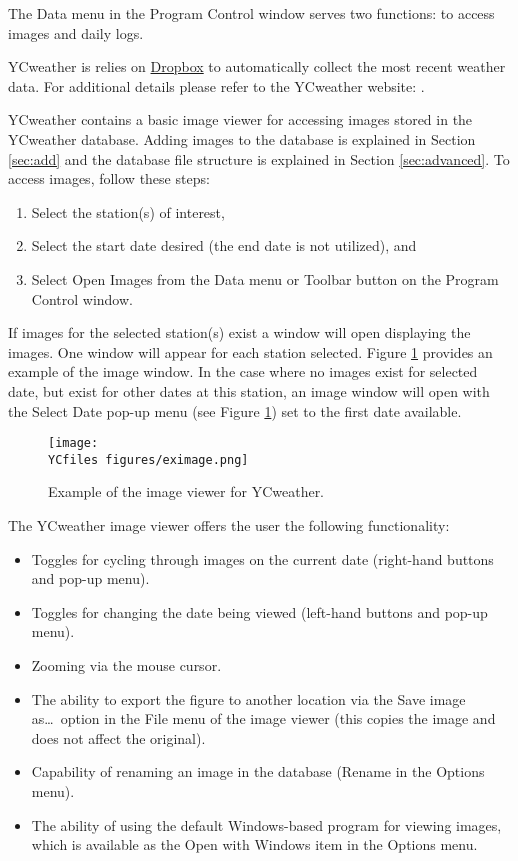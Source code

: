 \label{sec:data}
The Data menu in the Program Control window serves two functions: to access images and daily logs.

YCweather is relies on \href{https://dropbox.com}{Dropbox} to automatically collect the most recent weather data. For additional details please refer to the YCweather website: .

 \label{sec:images}
YCweather contains a basic image viewer for accessing images stored in the YCweather database.  Adding images to the database is explained in Section \ref{sec:add} and the database file structure is explained in Section \ref{sec:advanced}.  To access images, follow these steps:
\begin{enumerate}
	\item Select the station(s) of interest,
	\item Select the start date desired (the end date is not utilized), and
	\item Select Open Images from the Data menu or Toolbar button on the Program Control window.
\end{enumerate}

If images for the selected station(s) exist a window will open displaying the images. One window will appear for each station selected.  Figure \ref{fig:eximage} provides an example of the image window.  In the case where no images exist for selected date, but exist for other dates at this station, an image window will open with the Select Date pop-up menu (see Figure \ref{fig:eximage}) set to the first date available.  

\begin{figure}[ht!]\centering
	\texttt{[image: \\YCfiles figures/eximage.png]}
	\caption{Example of the image viewer for YCweather.}
	\label{fig:eximage}
\end{figure}

The YCweather image viewer offers the user the following functionality:
\begin{itemize}
     \item Toggles for cycling through images on the current date (right-hand buttons and pop-up menu).
     \item Toggles for changing the date being viewed (left-hand buttons and pop-up menu).
     \item Zooming via the mouse cursor.
     \item The ability to export the figure to another location via the Save image as\ldots ~option in the File menu of the image viewer (this copies the image and does not affect the original).
     \item Capability of renaming an image in the database (Rename in the Options menu).
     \item The ability of using the default Windows-based program for viewing images, which is available as the Open with Windows item in the Options menu. 
\end{itemize}

